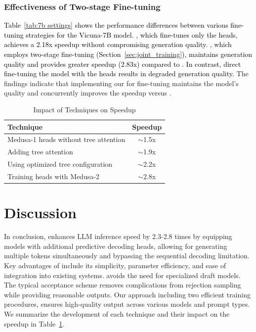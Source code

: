 \subsubsection{Effectiveness of Two-stage Fine-tuning}

\textcolor{black}{
Table~\ref{tab:7b settings} shows the performance differences between various fine-tuning strategies for the Vicuna-7B model. , which fine-tunes only the \ours heads, achieves a 2.18x speedup without compromising generation quality. , which employs two-stage fine-tuning (Section~\ref{sec:joint_training}), maintains generation quality and provides greater speedup (2.83x) compared to . In contrast, direct fine-tuning the model with the \ours heads results in degraded generation quality. 
}
The findings indicate that implementing our  for fine-tuning maintains the model's quality and concurrently improves the speedup versus .

\begin{table}[h]
    \centering
    \caption{Impact of Techniques on Speedup}
    \begin{tabular}{lc}
    \toprule
    Technique & Speedup \\ \midrule
    Medusa-1 heads without tree attention & $\sim$1.5x \\
    Adding tree attention & $\sim$1.9x \\
    Using optimized tree configuration & $\sim$2.2x \\
    Training heads with Medusa-2 & $\sim$2.8x \\ \bottomrule
    \end{tabular}
    \label{tab:impact_of_tech}
\end{table}

\section{Discussion}
In conclusion, \ours enhances LLM inference speed by 2.3-2.8 times by equipping models with additional predictive decoding heads, allowing for generating multiple tokens simultaneously and bypassing the sequential decoding limitation. Key advantages of \ours include its simplicity, parameter efficiency, and ease of integration into existing systems.
\ours avoids the need for specialized draft models. The typical acceptance scheme removes complications from rejection sampling while providing reasonable outputs. Our approach including two efficient training procedures, ensures high-quality output across various models and prompt types. We summarize the development of each technique and their impact on the speedup in Table~\ref{tab:impact_of_tech}.

